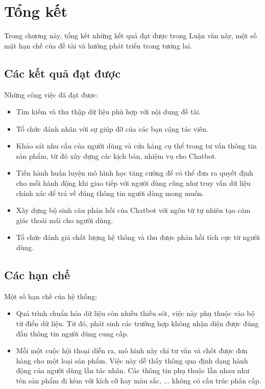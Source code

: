 \chapter{Tổng kết}

Trong chương này, tổng kết những kết quả đạt được trong Luận văn này,
một số mặt hạn chế của đề tài và hướng phát triển trong tương lai.

\section{Các kết quả đạt được}
Những công việc đã đạt được:

\begin{itemize}
    \item Tìm kiếm và thu thập dữ liệu phù hợp với nội dung đề tài.
    \item Tổ chức đánh nhãn với sự giúp đỡ của các bạn cộng tác viên.
    \item Khảo sát nhu cầu của người dùng và cửa hàng cụ thể trong
    tư vấn thông tin sản phẩm, từ đó xây dựng các kịch bản, nhiệm vụ
    cho Chatbot.
    \item Tiến hành huấn luyện mô hình học tăng cường để có thể đưa ra
    quyết định cho mỗi hành động khi giao tiếp với người dùng cũng như
    truy vấn dữ liệu chính xác để trả về đúng thông tin người dùng mong muốn.
    \item Xây dựng bộ sinh câu phản hồi của Chatbot với ngôn từ
    tự nhiên tạo cảm giác thoải mái cho người dùng.
    \item Tổ chức đánh giá chất lượng hệ thống và thu được phản hồi
    tích cực từ người dùng.
\end{itemize}

\section{Các hạn chế}
Một số hạn chế của hệ thống:

\begin{itemize}
    \item Quá trình chuẩn hóa dữ liệu còn nhiều thiếu sót, việc này
    phụ thuộc vào bộ từ điển dữ liệu. Từ đó, phát sinh các trường hợp
    không nhận diện được đúng đắn thông tin người dùng cung cấp.
    \item Mỗi một cuộc hội thoại diễn ra, mô hình này chỉ tư vấn và
    chốt được đơn hàng cho một loại sản phẩm. Việc này dễ thấy thông qua
    định dạng hành động của người dùng lẫn tác nhân. Các thông tin
    phụ thuộc lẫn nhau như tên sản phẩm đi kèm với kích cỡ hay
    màu sắc, ... không có cấu trúc phân cấp.
\end{itemize}


